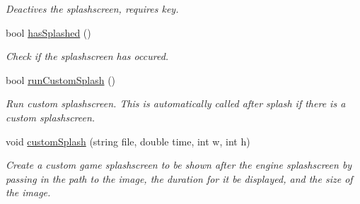 \begin{DoxyCompactItemize}
\begin{DoxyCompactList}\small\item\em Deactives the splashscreen, requires key. \end{DoxyCompactList}\item 
bool \hyperlink{classEngine_aabab82c2ba4dca772a28dbbd4fe08cb4}{has\+Splashed} ()\hypertarget{classEngine_aabab82c2ba4dca772a28dbbd4fe08cb4}{}\label{classEngine_aabab82c2ba4dca772a28dbbd4fe08cb4}

\begin{DoxyCompactList}\small\item\em Check if the splashscreen has occured. \end{DoxyCompactList}\item 
bool \hyperlink{classEngine_a5c87c90c9dd6b3fd652e24af0c7e935d}{run\+Custom\+Splash} ()\hypertarget{classEngine_a5c87c90c9dd6b3fd652e24af0c7e935d}{}\label{classEngine_a5c87c90c9dd6b3fd652e24af0c7e935d}

\begin{DoxyCompactList}\small\item\em Run custom splashscreen. This is automatically called after splash if there is a custom splashscreen. \end{DoxyCompactList}\item 
void \hyperlink{classEngine_a0960e415d0b9ed92099eee6677d7ea51}{custom\+Splash} (string file, double time, int w, int h)\hypertarget{classEngine_a0960e415d0b9ed92099eee6677d7ea51}{}\label{classEngine_a0960e415d0b9ed92099eee6677d7ea51}

\begin{DoxyCompactList}\small\item\em Create a custom game splashscreen to be shown after the engine splashscreen by passing in the path to the image, the duration for it be displayed, and the size of the image. \end{DoxyCompactList}\end{DoxyCompactItemize}
